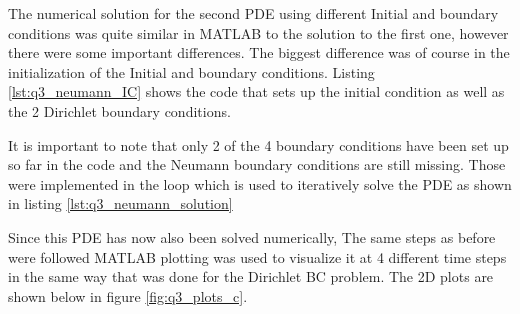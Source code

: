 \documentclass[12pt]{article}
\begin{document}
The numerical solution for the second PDE using different Initial and boundary conditions was quite similar in MATLAB to the solution to the first one, however there were some important differences. The biggest difference was of course in the initialization of the Initial and boundary conditions. Listing \ref{lst:q3_neumann_IC} shows the code that sets up the initial condition as well as the 2 Dirichlet boundary conditions.



It is important to note that only 2 of the 4 boundary conditions have been set up so far in the code and the Neumann boundary conditions are still missing. Those were implemented in the loop which is used to iteratively solve the PDE as shown in listing \ref{lst:q3_neumann_solution}


                 
Since this PDE has now also been solved numerically, The same steps as before were followed MATLAB plotting was used to visualize it at 4 different time steps in the same way that was done for the Dirichlet BC problem. The 2D plots are shown below in figure \ref{fig:q3_plots_c}.
\end{document}
